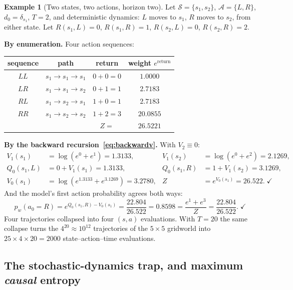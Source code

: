 \documentclass[11pt]{article}
\theoremstyle{plain}
\theoremstyle{definition}
\newtheorem{example}[theorem]{Example}
\theoremstyle{remark}
\renewcommand{\S}{\mathcal{S}}
\newcommand{\A}{\mathcal{A}}
\begin{document}
\begin{example}[Two states, two actions, horizon two]\label{ex:worked}
Let $\S=\{s_1,s_2\}$, $\A=\{L,R\}$, $d_0=\delta_{s_1}$, $T=2$, and
deterministic dynamics: $L$ moves to $s_1$, $R$ moves to $s_2$, from
either state. Let $R(s_1,L)=0$, $R(s_1,R)=1$, $R(s_2,L)=0$, $R(s_2,R)=2$.

\textbf{By enumeration.} Four action sequences:
\begin{center}
\begin{tabular}{@{}cccc@{}}
\toprule
sequence & path & return & weight $e^{\text{return}}$\\
\midrule
$LL$ & $s_1\to s_1\to s_1$ & $0+0=0$ & $1.0000$\\
$LR$ & $s_1\to s_1\to s_2$ & $0+1=1$ & $2.7183$\\
$RL$ & $s_1\to s_2\to s_1$ & $1+0=1$ & $2.7183$\\
$RR$ & $s_1\to s_2\to s_2$ & $1+2=3$ & $20.0855$\\
\midrule
& & $Z=$ & $26.5221$\\
\bottomrule
\end{tabular}
\end{center}

\textbf{By the backward recursion~\eqref{eq:backwardv}.} With $V_2\equiv0$:
\begin{align*}
V_1(s_1) &= \log(e^0+e^1) = 1.3133, & V_1(s_2) &= \log(e^0+e^2) = 2.1269,\\
Q_0(s_1,L) &= 0 + V_1(s_1) = 1.3133, & Q_0(s_1,R) &= 1 + V_1(s_2) = 3.1269,\\
V_0(s_1) &= \log(e^{1.3133}+e^{3.1269}) = 3.2780, & Z &= e^{V_0(s_1)} = 26.522. \;\checkmark
\end{align*}
And the model's first action probability agrees both ways:
\begin{equation*}
p_w(a_0=R) = e^{Q_0(s_1,R) - V_0(s_1)} = \frac{22.804}{26.522} = 0.8598
= \frac{e^1+e^3}{Z} = \frac{22.804}{26.522}. \;\checkmark
\end{equation*}
Four trajectories collapsed into four $(s,a)$ evaluations. With $T=20$ the
same collapse turns the $4^{20}\approx10^{12}$ trajectories of the
$5\times5$ gridworld into $25\times4\times20=2000$ state--action--time evaluations.
\end{example}

\subsection{The stochastic-dynamics trap, and maximum \emph{causal} entropy}
\label{sec:causaltrap}
\end{document}

